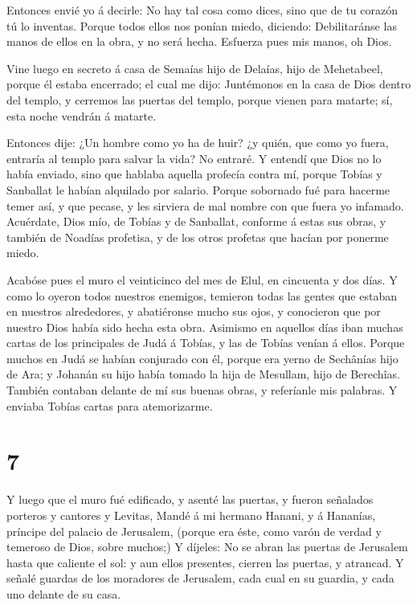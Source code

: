  Entonces envié yo á decirle: No hay tal cosa como dices,
sino que de tu corazón tú lo inventas.  Porque todos ellos
nos ponían miedo, diciendo: Debilitaránse las manos de ellos en la obra,
y no será hecha. Esfuerza pues mis manos, oh Dios.

 Vine luego en secreto á casa de Semaías hijo de Delaías,
hijo de Mehetabeel, porque él estaba encerrado; el cual me dijo:
Juntémonos en la casa de Dios dentro del templo, y cerremos las puertas
del templo, porque vienen para matarte; sí, esta noche vendrán á
matarte.

 Entonces dije: ¿Un hombre como yo ha de huir? ¿y quién,
que como yo fuera, entraría al templo para salvar la vida? No entraré.
 Y entendí que Dios no lo había enviado, sino que hablaba
aquella profecía contra mí, porque Tobías y Sanballat le habían
alquilado por salario.  Porque sobornado fué para hacerme
temer así, y que pecase, y les sirviera de mal nombre con que fuera yo
infamado.  Acuérdate, Dios mío, de Tobías y de Sanballat,
conforme á estas sus obras, y también de Noadías profetisa, y de los
otros profetas que hacían por ponerme miedo.

 Acabóse pues el muro el veinticinco del mes de Elul, en
cincuenta y dos días.  Y como lo oyeron todos nuestros
enemigos, temieron todas las gentes que estaban en nuestros alrededores,
y abatiéronse mucho sus ojos, y conocieron que por nuestro Dios había
sido hecha esta obra.  Asimismo en aquellos días iban
muchas cartas de los principales de Judá á Tobías, y las de Tobías
venían á ellos.  Porque muchos en Judá se habían conjurado
con él, porque era yerno de Sechânías hijo de Ara; y Johanán su hijo
había tomado la hija de Mesullam, hijo de Berechîas. 
También contaban delante de mí sus buenas obras, y referíanle mis
palabras. Y enviaba Tobías cartas para atemorizarme.

\hypertarget{section-6}{%
\section{7}\label{section-6}}

 Y luego que el muro fué edificado, y asenté las puertas, y
fueron señalados porteros y cantores y Levitas,  Mandé á mi
hermano Hanani, y á Hananías, príncipe del palacio de Jerusalem, (porque
era éste, como varón de verdad y temeroso de Dios, sobre muchos;)
 Y díjeles: No se abran las puertas de Jerusalem hasta que
caliente el sol: y aun ellos presentes, cierren las puertas, y atrancad.
Y señalé guardas de los moradores de Jerusalem, cada cual en su guardia,
y cada uno delante de su casa.

